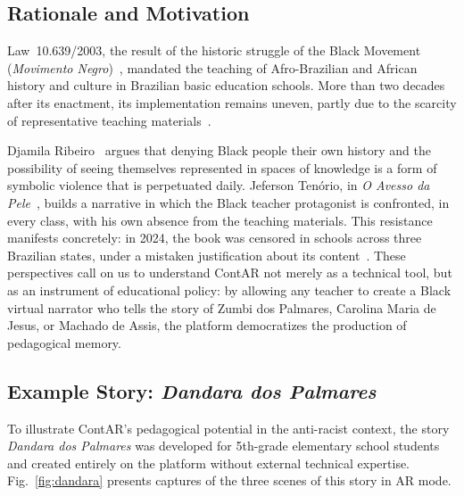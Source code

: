 \documentclass[conference]{IEEEtran}
\begin{document}
\subsection{Rationale and Motivation}

Law~10.639/2003, the result of the historic struggle of the Black Movement
(\textit{Movimento Negro})~\cite{santos2005}, mandated the teaching of
Afro-Brazilian and African history and culture in Brazilian basic education
schools. More than two decades after its enactment, its implementation
remains uneven, partly due to the scarcity of representative teaching
materials~\cite{araujo2023a,rocha2015}.

Djamila Ribeiro~\cite{ribeiro2019} argues that denying Black people their own
history and the possibility of seeing themselves represented in spaces of
knowledge is a form of symbolic violence that is perpetuated daily. Jeferson
Tenório, in \textit{O Avesso da Pele}~\cite{tenorio2020}, builds a narrative
in which the Black teacher protagonist is confronted, in every class, with his
own absence from the teaching materials. This resistance manifests
concretely: in 2024, the book was censored in schools across three Brazilian
states, under a mistaken justification about its content~\cite{g1_2024}.
These perspectives call on us to understand ContAR not merely as a technical
tool, but as an instrument of educational policy: by allowing any teacher to
create a Black virtual narrator who tells the story of Zumbi dos Palmares,
Carolina Maria de Jesus, or Machado de Assis, the platform democratizes the
production of pedagogical memory.

\subsection{Example Story: \textit{Dandara dos Palmares}}

To illustrate ContAR's pedagogical potential in the anti-racist context, the
story \textit{Dandara dos Palmares} was developed for 5th-grade elementary
school students and created entirely on the platform without external
technical expertise. Fig.~\ref{fig:dandara} presents captures of the three
scenes of this story in AR mode.
\end{document}
